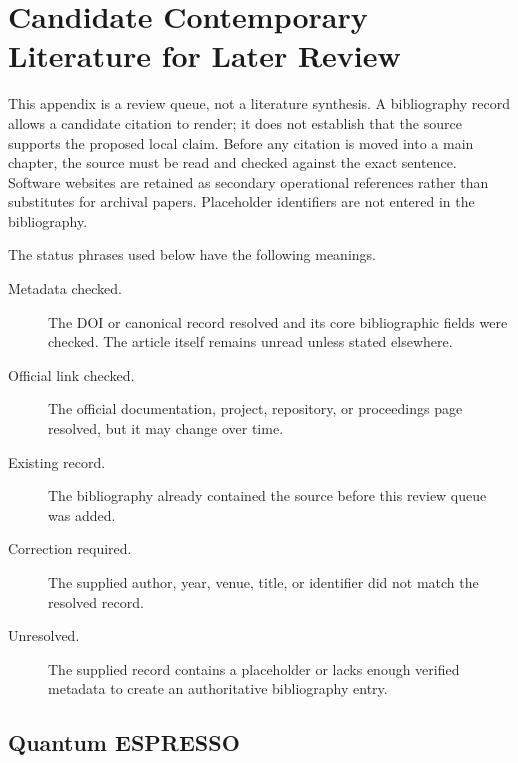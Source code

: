 \chapter{Candidate Contemporary Literature for Later Review}
\label{app:candidate-contemporary-literature}


This appendix is a review queue, not a literature synthesis. A bibliography
record allows a candidate citation to render; it does not establish that the
source supports the proposed local claim. Before any citation is moved into a
main chapter, the source must be read and checked against the exact sentence.
Software websites are retained as secondary operational references rather than
substitutes for archival papers. Placeholder identifiers are not entered in the
bibliography.

The status phrases used below have the following meanings.

\begin{description}
  \item[Metadata checked.] The DOI or canonical record resolved and its core
    bibliographic fields were checked. The article itself remains unread unless
    stated elsewhere.
  \item[Official link checked.] The official documentation, project, repository,
    or proceedings page resolved, but it may change over time.
  \item[Existing record.] The bibliography already contained the source before
    this review queue was added.
  \item[Correction required.] The supplied author, year, venue, title, or
    identifier did not match the resolved record.
  \item[Unresolved.] The supplied record contains a placeholder or lacks enough
    verified metadata to create an authoritative bibliography entry.
\end{description}

\section{Quantum ESPRESSO}


